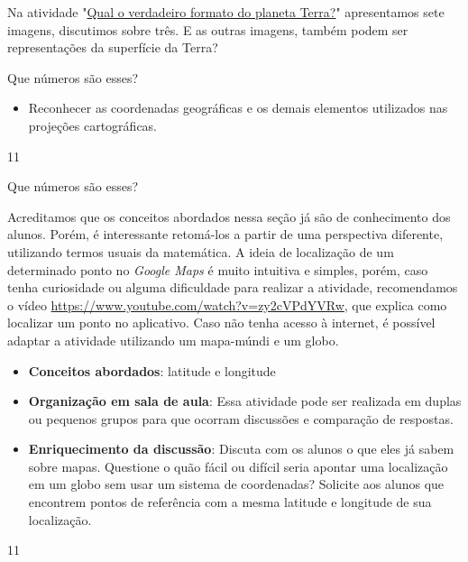 \begin{reflection}
Na atividade "\hyperref[forma_terra]{Qual o verdadeiro formato do planeta Terra?}" apresentamos sete imagens, discutimos sobre três. E as outras imagens, também podem ser representações da superfície da Terra?
\end{reflection}






\cleardoublepage
\def\currentcolor{session1}
\begin{objectives}{Que números são esses?}
{
  \begin{itemize}
  \item Reconhecer as coordenadas geográficas e os demais elementos utilizados nas projeções cartográficas.
  
  \end{itemize}
}{1}{1}
\end{objectives}
\begin{sugestions}{Que números são esses?}
{
Acreditamos que os conceitos abordados nessa seção já são de conhecimento dos alunos. Porém, é interessante retomá-los a partir de uma perspectiva diferente, utilizando termos usuais da matemática. A ideia de localização de um determinado ponto no \textit{Google Maps} é muito intuitiva e simples, porém, caso tenha curiosidade ou alguma dificuldade para realizar a atividade, recomendamos o vídeo \url{https://www.youtube.com/watch?v=zy2cVPdYVRw}, que explica como localizar um ponto no aplicativo. Caso não tenha acesso à internet, é possível adaptar a atividade utilizando um mapa-múndi e um globo.

\begin{itemize}
\item \textbf{Conceitos abordados}: latitude e longitude
\item \textbf{Organização em sala de aula}: Essa atividade pode ser realizada em duplas ou pequenos grupos para que ocorram discussões e comparação de respostas.
\item \textbf{Enriquecimento da discussão}: Discuta com os alunos o que eles já sabem sobre mapas. Questione o quão fácil ou difícil seria apontar uma localização em um globo sem usar um sistema de coordenadas? Solicite aos alunos que encontrem pontos de referência com a mesma latitude e longitude de sua localização.
\end{itemize}
}{1}{1}
\end{sugestions}
